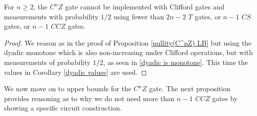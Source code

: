 \documentclass[12pt]{dalthesis}
\begin{document}
\begin{lemma}
\label{CCZ lowerbound}
For $n \geq 2$, the $C^n Z$ gate cannot be implemented with Clifford gates and measurements with probability $1/2$ using fewer than $2n-2$ $T$ gates, or $n-1$ $CS$ gates, or $n-1$ $CCZ$ gates.
\end{lemma}
\begin{proof}
We reason as in the proof of Proposition \ref{nullity(C^nZ) LB} but using the dyadic monotone which is also non-increasing under Clifford operations, but with measurements of probability $1/2$, as seen in \ref{dyadic is monotone}. This time the values in Corollary \ref{dyadic values} are used.
\end{proof}

We now move on to upper bounds for the $C^nZ$ gate. The next proposition provides reasoning as to why we do not need more than $n-1$ $CCZ$ gates by showing a specific circuit construction.
\end{document}

